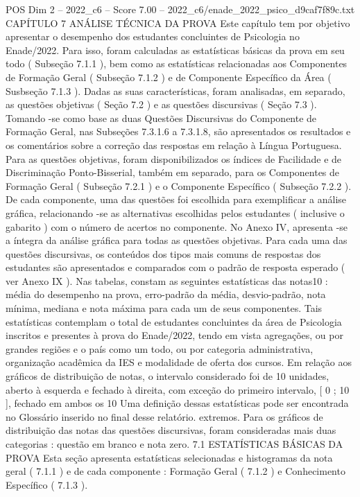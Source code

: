 \begin{textsample}{POS Dim 2 – 2022\_c6 – Score 7.00 – 2022\_c6/enade\_2022\_psico\_d9caf7f89c.txt}  \label{ex:f2_pos_135}
CAPÍTULO 7 ANÁLISE TÉCNICA DA PROVA Este capítulo tem por objetivo apresentar o desempenho dos estudantes concluintes de Psicologia no Enade/2022.
Para isso, foram calculadas as estatísticas básicas da prova em seu todo ( Subseção 7.1.1 ), bem como as estatísticas relacionadas aos Componentes de Formação Geral ( Subseção 7.1.2 ) e de Componente Específico da Área ( Susbseção 7.1.3 ).
Dadas as suas características, foram analisadas, em separado, as questões objetivas ( Seção 7.2 ) e as questões discursivas ( Seção 7.3 ).
Tomando -se como base as duas Questões Discursivas do Componente de Formação Geral, nas Subseções 7.3.1.6 a 7.3.1.8, são apresentados os resultados e os comentários sobre a correção das respostas em relação à Língua Portuguesa.
Para as questões objetivas, foram disponibilizados os índices de Facilidade e de Discriminação Ponto-Bisserial, também em separado, para os Componentes de Formação Geral ( Subseção 7.2.1 ) e o Componente Específico ( Subseção 7.2.2 ).
De cada componente, uma das questões foi escolhida para exemplificar a análise gráfica, relacionando -se as alternativas escolhidas pelos estudantes ( inclusive o gabarito ) com o número de acertos no componente.
No Anexo IV, apresenta -se a íntegra da análise gráfica para todas as questões objetivas.
Para cada uma das questões discursivas, os conteúdos dos tipos mais comuns de respostas dos estudantes são apresentados e comparados com o padrão de resposta esperado ( ver Anexo IX ).
Nas tabelas, constam as seguintes estatísticas das notas10 : média do desempenho na prova, erro-padrão da média, desvio-padrão, nota mínima, mediana e nota máxima para cada um de seus componentes.
Tais estatísticas contemplam o total de estudantes concluintes da área de Psicologia inscritos e presentes à prova do Enade/2022, tendo em vista agregações, ou por grandes regiões e o país como um todo, ou por categoria administrativa, organização acadêmica da IES e modalidade de oferta dos cursos.
Em relação aos gráficos de distribuição de notas, o intervalo considerado foi de 10 unidades, aberto à esquerda e fechado à direita, com exceção do primeiro intervalo, [ 0 ; 10 ], fechado em ambos os 10 Uma definição dessas estatísticas pode ser encontrada no Glossário inserido no final desse relatório. extremos.
Para os gráficos de distribuição das notas das questões discursivas, foram consideradas mais duas categorias : questão em branco e nota zero. 7.1 ESTATÍSTICAS BÁSICAS DA PROVA Esta seção apresenta estatísticas selecionadas e histogramas da nota geral ( 7.1.1 ) e de cada componente : Formação Geral ( 7.1.2 ) e Conhecimento Específico ( 7.1.3 ).

\end{textsample}
